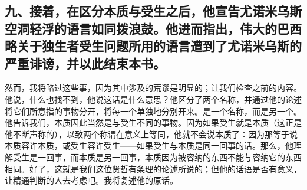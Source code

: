 
\subsection{九、接着，在区分本质与受生之后，他宣告尤诺米乌斯空洞轻浮的语言如同拨浪鼓。他进而指出，伟大的巴西略关于独生者受生问题所用的语言遭到了尤诺米乌斯的严重诽谤，并以此结束本书。}

然而，我将略过这些事，因为其中涉及的荒谬是明显的；让我们检查之前的内容。他说，什么也找不到，他说这话是什么意思？他区分了两个名称，并通过他的论述将它们所意指的事物分开，将每一个单独地分别开来。是一个名称，而是另一个。他告诉我们，本质因此当然是与受生不同的事物。因为如果受生就是本质（这正是他不断声称的），以致两个称谓在意义上等同，他就不会说本质了：因为那等于说本质容许本质，或受生容许受生——如果受生与本质是同一回事的话。那么，他理解受生是一回事，而本质是另一回事，本质因为被容纳的东西不能与容纳它的东西相同。好了，这就是我们这位贤哲有条理的论述所说的；但他的话语是否有意义，让精通判断的人去考虑吧。我将复述他的原话。\par

